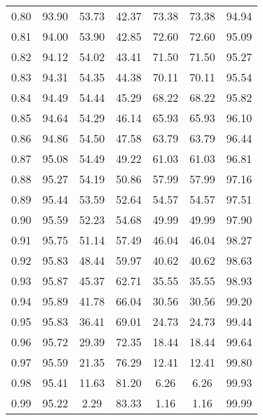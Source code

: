 \begin{tabular}{|c|c|c|c|c|c|c|}
      0.80 &     93.90 &     53.73 &      42.37 &   73.38 &      73.38 &         94.94 \\
      0.81 &     94.00 &     53.90 &      42.85 &   72.60 &      72.60 &         95.09 \\
      0.82 &     94.12 &     54.02 &      43.41 &   71.50 &      71.50 &         95.27 \\
      0.83 &     94.31 &     54.35 &      44.38 &   70.11 &      70.11 &         95.54 \\
      0.84 &     94.49 &     54.44 &      45.29 &   68.22 &      68.22 &         95.82 \\
      0.85 &     94.64 &     54.29 &      46.14 &   65.93 &      65.93 &         96.10 \\
      0.86 &     94.86 &     54.50 &      47.58 &   63.79 &      63.79 &         96.44 \\
      0.87 &     95.08 &     54.49 &      49.22 &   61.03 &      61.03 &         96.81 \\
      0.88 &     95.27 &     54.19 &      50.86 &   57.99 &      57.99 &         97.16 \\
      0.89 &     95.44 &     53.59 &      52.64 &   54.57 &      54.57 &         97.51 \\
      0.90 &     95.59 &     52.23 &      54.68 &   49.99 &      49.99 &         97.90 \\
      0.91 &     95.75 &     51.14 &      57.49 &   46.04 &      46.04 &         98.27 \\
      0.92 &     95.83 &     48.44 &      59.97 &   40.62 &      40.62 &         98.63 \\
      0.93 &     95.87 &     45.37 &      62.71 &   35.55 &      35.55 &         98.93 \\
      0.94 &     95.89 &     41.78 &      66.04 &   30.56 &      30.56 &         99.20 \\
      0.95 &     95.83 &     36.41 &      69.01 &   24.73 &      24.73 &         99.44 \\
      0.96 &     95.72 &     29.39 &      72.35 &   18.44 &      18.44 &         99.64 \\
      0.97 &     95.59 &     21.35 &      76.29 &   12.41 &      12.41 &         99.80 \\
      0.98 &     95.41 &     11.63 &      81.20 &    6.26 &       6.26 &         99.93 \\
      0.99 &     95.22 &      2.29 &      83.33 &    1.16 &       1.16 &         99.99 \\
\bottomrule
\end{tabular}
